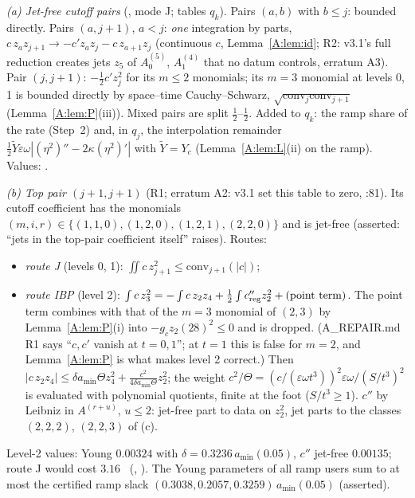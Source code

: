 \documentclass[11pt]{article}
\begin{document}
\emph{(a) Jet-free cutoff pairs} (, mode J; tables $q_k$). Pairs $(a,b)$ with $b\le j$: bounded directly. Pairs $(a,j+1)$, $a<j$: \emph{one} integration by parts, $c\,z_az_{j+1}\to-c'z_az_j-c\,z_{a+1}z_j$ (continuous $c$, Lemma~\ref{A:lem:id}; R2: v3.1's full reduction creates jets $z_5$ of $A_0^{(5)}$, $A_1^{(4)}$ that no datum controls, erratum A3). Pair $(j,j+1)$: $-\frac12c'z_j^2$ for its $m\le2$ monomials; its $m=3$ monomial at levels 0, 1 is bounded directly by space--time Cauchy--Schwarz, $\sqrt{\mathrm{conv}_j\mathrm{conv}_{j+1}}$ (Lemma~\ref{A:lem:P}(iii)). Mixed pairs are split $\frac12$--$\frac12$. Added to $q_k$: the ramp share of the rate (Step~2) and, in $q_j$, the interpolation remainder $\frac12\tilde Y\varepsilon\omega|(\eta^2)''-2\kappa(\eta^2)'|$ with $\tilde Y=Y_c$ (Lemma~\ref{A:lem:L}(ii) on the ramp). Values: .

\emph{(b) Top pair $(j+1,j+1)$} (R1; erratum A2: v3.1 set this table to zero, :81). Its cutoff coefficient has the monomials $(m,i,r)\in\{(1,1,0),(1,2,0),(1,2,1),(2,2,0)\}$ and is jet-free (asserted: ``jets in the top-pair coefficient itself'' raises). Routes:
\begin{itemize}[leftmargin=*]
\item \emph{route J} (levels 0, 1): $\iint c\,z_{j+1}^2\le\mathrm{conv}_{j+1}(|c|)$;
\item \emph{route IBP} (level 2): $\int c\,z_3^2=-\int c\,z_2z_4+\frac12\int c''_{\rm reg}z_2^2+(\text{point term})$. The point term combines with that of the $m=3$ monomial of $(2,3)$ by Lemma~\ref{A:lem:P}(i) into $-g_cz_2(28)^2\le0$ and is dropped. (A\_REPAIR.md R1 says ``$c,c'$ vanish at $t=0,1$''; at $t=1$ this is false for $m=2$, and Lemma~\ref{A:lem:P} is what makes level 2 correct.) Then $|c\,z_2z_4|\le\delta a_{\min}\Theta z_4^2+\frac{c^2}{4\delta a_{\min}\Theta}z_2^2$; the weight $c^2/\Theta=(c/(\varepsilon\omega t^3))^2\varepsilon\omega/(S/t^3)^2$ is evaluated with polynomial quotients, finite at the foot ($S/t^3\ge1$). $c''$ by Leibniz in $A^{(r+u)}$, $u\le2$: jet-free part to data on $z_2^2$, jet parts to the classes $(2,2,2)$, $(2,2,3)$ of (c).
\end{itemize}
Level-2 values: Young $0.00324$ with $\delta=0.3236\,a_{\min}(0.05)$, $c''$ jet-free $0.00135$; route J would cost $3.16$ \tC\ (, ). The Young parameters of all ramp users sum to at most the certified ramp slack $(0.3038,0.2057,0.3259)\,a_{\min}(0.05)$ (asserted).
\end{document}
